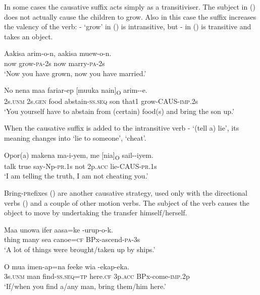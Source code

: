 In some cases the causative suffix acts simply as a transitiviser. The subject in () does not actually cause the children to grow. Also in this case the suffix increases the valency of the verb: - `grow' in () is intransitive, but - in () is transitive and takes an object.

\ea%
\label{ex:x995}
\gll Aakisa arim-o-n, aakisa muew-o-n. \\
now grow-\textsc{pa}-2s now marry-\textsc{pa}-2s\\
\glt`Now you have grown, now you have married.'
\z

\ea%
\label{ex:x996}
\gll No nena maa fariar-ep [muuka nain]\textsubscript{O} arim--e.\\
2s.\textsc{unm} 2s.\textsc{gen} food abstain-\textsc{ss}.\textsc{seq} son that1 grow-CAUS-\textsc{imp}.2s\\
\glt`You yourself have to abstain from (certain) food(s) and bring the son up.'
\z

When the causative suffix is added to the intransitive verb - `(tell a) lie', its meaning changes into `lie to someone', `cheat'. 

\ea%
\label{ex:x448}
\gll Opor(a) makena ma-i-yem, me [nia]\textsubscript{O} sail--iyem. \\
talk true say-Np-\textsc{pr}.1s not 2p.\textsc{acc} lie-CAUS-\textsc{pr}.1s\\
\glt`I am telling the truth, I am not cheating you.'
\z

Bring-\textsc{pr}efixes () are another causative strategy, used only with the directional verbs () and a couple of other motion verbs. The subject of the verb causes the object to move by undertaking the transfer himself/herself.

\ea%
\label{ex:x999}
\gll Maa unowa ifer aasa=ke -urup-o-k. \\
thing many sea canoe=\textsc{cf} BPx-ascend-\textsc{pa}-3s\\
\glt`A lot of things were brought/taken up by ships.'
\z

\ea%
\label{ex:x1001}
\gll O mua imen-ap=na feeke wia -ekap-eka. \\
3s.\textsc{unm} man find-\textsc{ss}.\textsc{seq}=\textsc{tp} here.\textsc{cf} 3p.\textsc{acc} BPx-come-\textsc{imp}.2p\\
\glt`If/when you find a/any man, bring them/him here.'
\z

